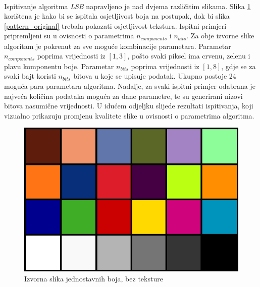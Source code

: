 \documentclass[times, utf8, seminar]{fer}
\begin{document}
\paragraph{}
Ispitivanje algoritma \textit{LSB} napravljeno je nad dvjema različitim slikama. Slika \ref{chart_original} korištena je kako bi se ispitala osjetljivost boja na postupak, dok bi slika \ref{pattern_original} trebala pokazati osjetljivost tekstura. Ispitni primjeri pripremljeni su u ovisnosti o parametrima $n_{components}$ i $n_{bits}$. Za obje izvorne slike algoritam je pokrenut za sve moguće kombinacije parametara. Parametar $n_{components}$ poprima vrijednosti iz $[1,3]$, pošto svaki piksel ima crvenu, zelenu i plavu komponentu boje. Parametar $n_{bits}$ poprima vrijednosti iz $[1,8]$, gdje se za svaki bajt koristi $n_{bits}$ bitova u koje se upisuje podatak. Ukupno postoje 24 moguća para parametara algoritma. Nadalje, za svaki ispitni primjer odabrana je najveća količina podataka moguća za dane parametre, te su generirani nizovi bitova nasumične vrijednosti. U idućem odjeljku slijede rezultati ispitivanja, koji vizualno prikazuju promjenu kvalitete slike u ovisnosti o parametrima algoritma.
\begin{center}
\begin{figure}[ht]
	\caption{Izvorna slika jednostavnih boja, bez teksture}
	\label{chart_original}
	\centerline{
	\includegraphics[scale=0.4]{../benchmark_results/color_chart/original.png}	
	}
\end{figure}
\end{center}
\end{document}
